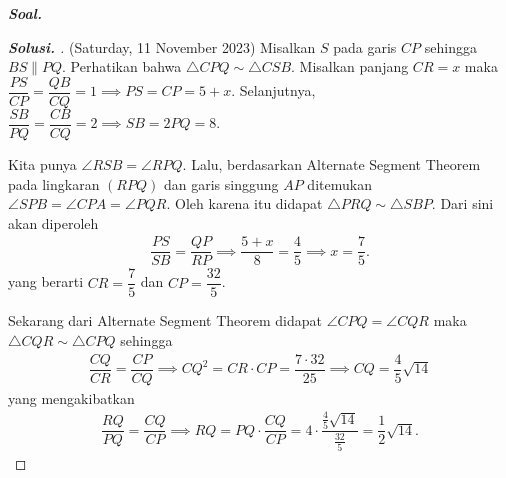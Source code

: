 \textbf{\textit{Soal. }}
\begin{proof}[\textbf{Solusi. }] (Saturday, 11 November 2023)  Misalkan $S$ pada garis $CP$ sehingga $BS \parallel PQ$. Perhatikan bahwa $\triangle CPQ \sim \triangle CSB$. Misalkan panjang $CR = x$ maka $\dfrac{PS}{CP} = \dfrac{QB}{CQ} = 1 \implies PS=CP=5+x$. Selanjutnya, $\dfrac{SB}{PQ}=\dfrac{CB}{CQ}=2 \implies SB = 2PQ=8$. 

Kita punya
$\angle RSB = \angle RPQ$. Lalu, berdasarkan Alternate Segment Theorem pada lingkaran $(RPQ)$ dan garis singgung $AP$ ditemukan $\angle SPB= \angle CPA= \angle PQR$. Oleh karena itu didapat $\triangle PRQ \sim \triangle SBP$.
Dari sini akan diperoleh
\begin{align*}
    \dfrac{PS}{SB} = \dfrac{QP}{RP} \implies \dfrac{5+x}{8} = \dfrac{4}{5} \implies x=\dfrac{7}{5}.
\end{align*}
yang berarti $CR=\dfrac{7}{5}$ dan $CP=\dfrac{32}{5}$.

    

Sekarang dari Alternate Segment Theorem didapat $\angle CPQ = \angle CQR$ maka $\triangle CQR \sim \triangle CPQ$ sehingga 
\begin{align*}
    \dfrac{CQ}{CR} = \dfrac{CP}{CQ} \implies CQ^2 = CR\cdot CP = \dfrac{7\cdot 32}{25} \implies CQ = \dfrac{4}{5}\sqrt{14}
\end{align*}
yang mengakibatkan 
\begin{align*}
    \dfrac{RQ}{PQ} = \dfrac{CQ}{CP} \implies RQ = PQ\cdot\dfrac{CQ}{CP}=4\cdot \dfrac{\frac{4}{5}\sqrt{14}}{\frac{32}{5}} = \dfrac{1}{2}\sqrt{14}.
\end{align*}
\end{proof}